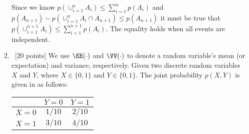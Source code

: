 \documentclass[12pt, fullpage,letterpaper]{article}
\begin{document}
\begin{enumerate}
Since we know $p(\cup_{i=1}^n A_i) \le \sum_{i=1}^n p(A_i)$ and $p(A_{n+1}) - p(\cup_{i=1}^n A_i \cap A_{n+1}) \le p(A_{n+1})$ it must be true that $p(\cup_{i=1}^{n+1} A_i) \le \sum_{i=1}^{n+1} p(A_i)$.  The equality holds when all events are independent.
\item~[20 points]  We use $\EE(\cdot)$ and $\VV(\cdot)$ to denote a random variable's mean (or expectation) and variance, respectively. Given two discrete random variables $X$ and $Y$, where $X \in \{0, 1\}$ and $Y \in \{0,1\}$. The joint probability $p(X,Y)$ is given in as follows:
\begin{table}[h]
        \centering
        \begin{tabular}{ccc}
        \hline\hline
         & $Y=0$ & $Y=1$ \\ \hline
         $X=0$ & $1/10$ & $2/10$ \\ \hline
         $X=1$  & $3/10$ & $4/10$ \\ \hline\hline
        \end{tabular}
        \end{table}
	

\end{enumerate}
\end{document}
